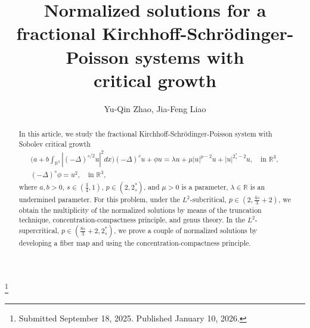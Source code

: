 \documentclass[reqno]{amsart}
\begin{document}
\title[\hfilneg EJDE-2026/03\hfil 
Fractional Kirchhoff-Schr\"odinger-Poisson system]
{Normalized solutions for a fractional Kirchhoff-Schr\"odinger-Poisson
systems with \\ critical growth}

\author[Y.-Q. Zhao, J.-F. Liao \hfil EJDE-2026/03\hfilneg]
{Yu-Qin Zhao, Jia-Feng Liao}

\address{Yu-Qin Zhao \newline
School of Mathematics Sciences,
China West Normal University, 
Nanchong, Sichuan 637009, China}

\address{Jia-Feng Liao (corresponding author) \newline
School of Mathematics Sciences,
China West Normal University, 
Nanchong, Sichuan 637009, China}

\thanks{Submitted September 18, 2025. Published January 10, 2026.}

\begin{abstract}
In this article, we study the fractional Kirchhoff-Schr\"odinger-Poisson
system with Sobolev critical growth
\begin{gather*}
\Big(a+b\int_{\mathbb{R}^3}|(-\Delta)^{s/2}u|^2dx\Big)
(-\Delta)^s u+ \phi u=\lambda u+ \mu|u|^{p-2}u+|u|^{2^*_s-2}u,
\quad \text{in }\mathbb{R}^3, \\
(-\Delta)^s \phi=u^2, \quad  \text{in }\mathbb{R}^3,
\end{gather*}
where $a,b>0$, $s\in(\frac{3}{4},1)$,   $p \in(2,2^*_s)$, and $\mu>0$ is a parameter,
$\lambda \in \mathbb{R}$ is an undermined parameter. For this problem, under the
$L^2$-subcritical, $p\in(2, \frac{4s}{3}+2)$, we obtain the multiplicity of the
normalized solutions by means of the truncation technique, concentration-compactness
principle, and  genus theory.
In the $L^2$-supercritical, $p\in( \frac{8s}{3}+2, 2^*_s)$, we prove a couple
of normalized solutions by developing a fiber map and using the
concentration-compactness principle.
\end{abstract}

\maketitle
{}
\newtheorem{theorem}{Theorem}[section]
\newtheorem{lemma}[theorem]{Lemma}
\newtheorem{corollary}[theorem]{Corollary}
\newtheorem{proposition}[theorem]{Proposition}
\newtheorem{remark}[theorem]{Remark}
\allowdisplaybreaks
\end{document}
